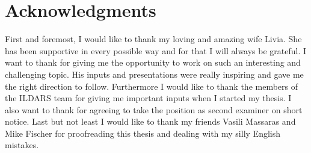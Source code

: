 \chapter{Acknowledgments}

First and foremost, I would like to thank my loving and amazing wife Livia.
She has been supportive in every possible way and for that I will always be grateful.\newline
I want to thank \firstexaminer{} for giving me the opportunity to work on such an interesting and challenging topic. His inputs and presentations were really inspiring and gave me the right direction to follow.\newline
Furthermore I would like to thank the members of the ILDARS team for giving me important inputs when I started my thesis.\newline
I also want to thank \secondexaminer{} for agreeing to take the position as second examiner on short notice.\newline
Last but not least I would like to thank my friends Vasili Massaras and Mike Fischer for proofreading this thesis and dealing with my silly English mistakes.
